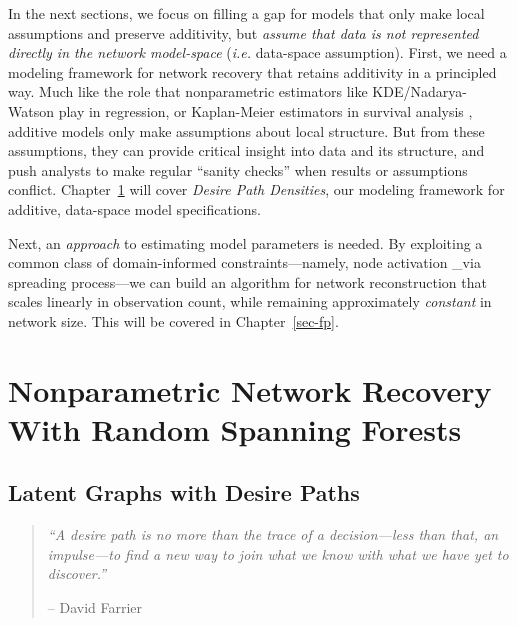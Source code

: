 \documentclass[%
	12pt,
		oneside,
		letterpaper
]{book}
\begin{document}
In the next sections, we focus on filling a gap for models that only make local assumptions and preserve additivity, but \emph{assume that data is not represented directly in the network model-space} (\emph{i.e.} data-space assumption).
First, we need a modeling framework for network recovery that retains additivity in a principled way.
Much like the role that nonparametric estimators like KDE/Nadarya-Watson play in regression, or Kaplan-Meier estimators in survival analysis \autocite{Topicsadvancedeconometrics_Bierens1996,NonparametricEstimationIncomplete_Kaplan1958}, additive models only make assumptions about local structure.
But from these assumptions, they can provide critical insight into data and its structure, and push analysts to make regular ``sanity checks'' when results or assumptions conflict.
Chapter~\ref{sec-desirepath} will cover \emph{Desire Path Densities}, our modeling framework for additive, data-space model specifications.

Next, an \emph{approach} to estimating model parameters is needed.
By exploiting a common class of domain-informed constraints---namely, node activation \_via spreading process---we can build an algorithm for network reconstruction that scales linearly in observation count, while remaining approximately \emph{constant} in network size.
This will be covered in Chapter~\ref{sec-fp}.

\part{Nonparametric Network Recovery With Random Spanning Forests}

\chapter{Latent Graphs with Desire Paths}\label{sec-desirepath}

\begin{flushright}

\begin{minipage}{.7\linewidth}

\singlespacing

\begin{quote}
\emph{``A desire path is no more than the trace of a decision---less than that, an impulse---to find a new way to join what we know with what we have yet to discover.''}

\hfill -- David Farrier\\
\doublespacing
\end{quote}

\end{minipage}

\end{flushright}
\end{document}
